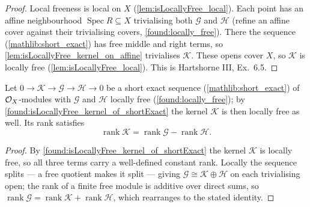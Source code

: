 \begin{proof}
  Local freeness is local on \(X\) (\cref{lem:isLocallyFree_local}).  Each point has
  an affine neighbourhood \(\operatorname{Spec}R\subseteq X\) trivialising both
  \(\mathcal G\) and \(\mathcal H\) (refine an affine cover against their
  trivialising covers, \cref{found:locally_free}).  There the sequence
  (\cref{mathlib:short_exact}) has free middle and right terms, so
  \cref{lem:isLocallyFree_kernel_on_affine} trivialises \(\mathcal K\).  These opens
  cover \(X\), so \(\mathcal K\) is locally free (\cref{lem:isLocallyFree_local}).
  This is Hartshorne III, Ex.~6.5.
\end{proof}

\begin{lemma}
  \label{found:rank_kernel_of_shortExact}
  Let \(0\to\mathcal K\to\mathcal G\to\mathcal H\to 0\) be a short exact sequence
  (\cref{mathlib:short_exact}) of \(\mathcal{O}_X\)-modules with \(\mathcal G\) and
  \(\mathcal H\) locally free (\cref{found:locally_free}); by
  \cref{found:isLocallyFree_kernel_of_shortExact} the kernel \(\mathcal K\) is then
  locally free as well.  Its rank satisfies
  \[
    \operatorname{rank}\mathcal K=\operatorname{rank}\mathcal G-\operatorname{rank}\mathcal H .
  \]
\end{lemma}

\begin{proof}
  By \cref{found:isLocallyFree_kernel_of_shortExact} the kernel \(\mathcal K\) is
  locally free, so all three terms carry a well-defined constant rank.  Locally the
  sequence splits --- a free quotient makes it split --- giving
  \(\mathcal G\cong\mathcal K\oplus\mathcal H\) on each trivialising open; the rank
  of a finite free module is additive over direct sums, so
  \(\operatorname{rank}\mathcal G=\operatorname{rank}\mathcal K+\operatorname{rank}
  \mathcal H\), which rearranges to the stated identity.
\end{proof}

